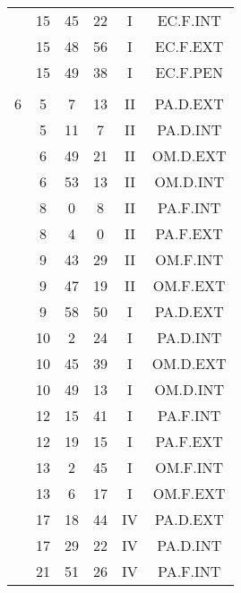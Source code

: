 \documentclass[12pt, a4paper]{article}
\begin{document}
\begin{multicols}{3}
{\begin{tabular}{c c c c c c}
	 	 	 	 & 15 & 45 & 22 & I & EC.F.INT\\%
	 	 	 	 & 15 & 48 & 56 & I & EC.F.EXT\\%
	 	 	 	 & 15 & 49 & 38 & I & EC.F.PEN\\%
	 	 	 	 & & & & & \\%
	 	 	 	6 & 5 & 7 & 13 & II & PA.D.EXT\\%
	 	 	 	 & 5 & 11 & 7 & II & PA.D.INT\\%
	 	 	 	 & 6 & 49 & 21 & II & OM.D.EXT\\%
	 	 	 	 & 6 & 53 & 13 & II & OM.D.INT\\%
	 	 	 	 & 8 & 0 & 8 & II & PA.F.INT\\%
	 	 	 	 & 8 & 4 & 0 & II & PA.F.EXT\\%
	 	 	 	 & 9 & 43 & 29 & II & OM.F.INT\\%
	 	 	 	 & 9 & 47 & 19 & II & OM.F.EXT\\%
	 	 	 	 & 9 & 58 & 50 & I & PA.D.EXT\\%
	 	 	 	 & 10 & 2 & 24 & I & PA.D.INT\\%
	 	 	 	 & 10 & 45 & 39 & I & OM.D.EXT\\%
	 	 	 	 & 10 & 49 & 13 & I & OM.D.INT\\%
	 	 	 	 & 12 & 15 & 41 & I & PA.F.INT\\%
	 	 	 	 & 12 & 19 & 15 & I & PA.F.EXT\\%
	 	 	 	 & 13 & 2 & 45 & I & OM.F.INT\\%
	 	 	 	 & 13 & 6 & 17 & I & OM.F.EXT\\%
	 	 	 	 & 17 & 18 & 44 & IV & PA.D.EXT\\%
	 	 	 	 & 17 & 29 & 22 & IV & PA.D.INT\\%
	 	 	 	 & 21 & 51 & 26 & IV & PA.F.INT\\%

\end{tabular}}
\end{multicols}
\end{document}
